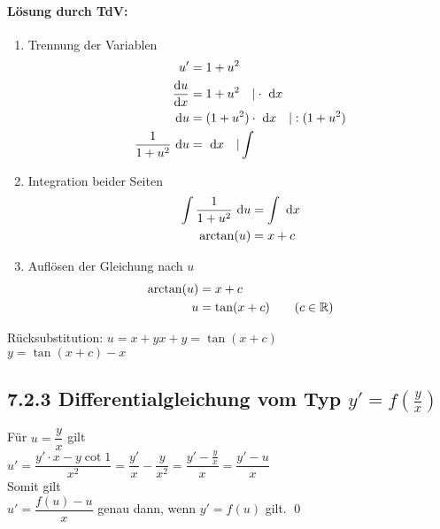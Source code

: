 \paragraph{Lösung durch TdV:}
\begin{enumerate}
	\item Trennung der Variablen
	\begin{align*}
	u'&=1+u^2\\
	\dfrac{\mathrm{d}u}{\mathrm{d}x}&=1+u^2\quad|\cdot\ \mathrm{d}x\\
	\ \mathrm{d}u&=(1+u^2)\cdot\ \mathrm{d}x\quad|:(1+u^2)\\
	\dfrac{1}{1+u^2}\ \mathrm{d}u&=\ \mathrm{d}x\quad|\int
	\end{align*}
	
	\item Integration beider Seiten
	\begin{align*}
	\int\dfrac{1}{1+u^2}\ \mathrm{d}u&=\int\ \mathrm{d}x\\
	\arctan(u)&=x+c
	\end{align*}
	
	\item Auflösen der Gleichung nach $u$
	\begin{align*}
	\arctan(u)&=x+c\\
	u&=\tan(x+c)\qquad(c\in\mathbb{R})
	\end{align*}
\end{enumerate}

Rücksubstitution: $u=x+y$\qquad$x+y=\tan(x+c)$\\
$y=\tan(x+c)-x$

\subsection{7.2.3 Differentialgleichung vom Typ $y'=f(\frac{y}{x})$}

\Beweis Für $u=\dfrac{y}{x}$ gilt\\
$u'=\dfrac{y'\cdot x - y\cot1}{x^2}=\dfrac{y'}{x}-\dfrac{y}{x^2}=\dfrac{y'-\frac{y}{x}}{x}=\dfrac{y'-u}{x}$\\
Somit gilt\\
\hhspace{2cm}$u'=\dfrac{f(u)-u}{x}$ genau dann, wenn $y'=f(u)$ gilt.
\qed

